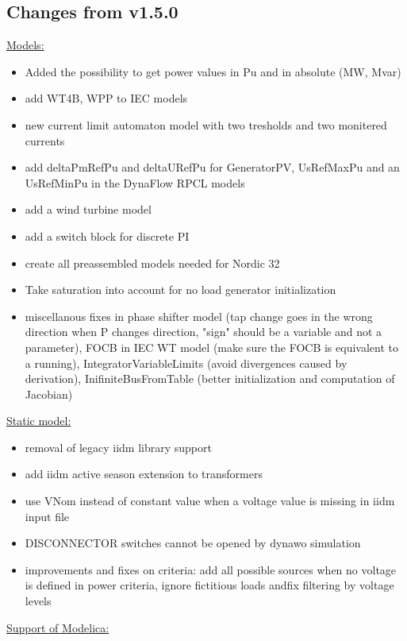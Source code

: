 \documentclass[a4paper, 12pt]{report}
\begin{document}
\subsection{Changes from v1.5.0}

\underline{Models:}

\begin{itemize}
\item Added the possibility to get power values in Pu and in absolute (MW, Mvar)
\item add WT4B, WPP to IEC models
\item new current limit automaton model with two tresholds and two monitered currents
\item add deltaPmRefPu and deltaURefPu for GeneratorPV, UsRefMaxPu and an UsRefMinPu in the DynaFlow RPCL models
\item add a wind turbine model
\item add a switch block for discrete PI
\item create all preassembled models needed for Nordic 32
\item Take saturation into account for no load generator initialization
\item miscellanous fixes in phase shifter model (tap change goes in the wrong direction when P changes direction, "sign" should be a variable and not a parameter), FOCB in IEC WT model (make sure the FOCB is equivalent to a running), IntegratorVariableLimits (avoid divergences caused by derivation), InifiniteBusFromTable (better initialization and computation of Jacobian)
\end{itemize}

\underline{Static model:}

\begin{itemize}
\item removal of legacy iidm library support
\item add iidm active season extension to transformers
\item use VNom instead of constant value when a voltage value is missing in iidm input file
\item DISCONNECTOR switches cannot be opened by dynawo simulation
\item improvements and fixes on criteria: add all possible sources when no voltage is defined in power criteria, ignore fictitious loads andfix filtering by voltage levels
\end{itemize}

\underline{Support of Modelica:}
\end{document}
